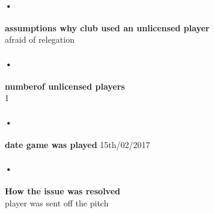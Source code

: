 \documentclass[12pt]{article}
\begin{document}
\paragraph{•}
\textbf{assumptions why club used an unlicensed player}\\
afraid of relegation 

\paragraph{•}
\textbf{numberof unlicensed players}\\
1

\paragraph{•}
\textbf{date game was played}
15th/02/2017

\paragraph{•}
\textbf{How the issue was resolved}\\
player was sent off the pitch
\end{document}
